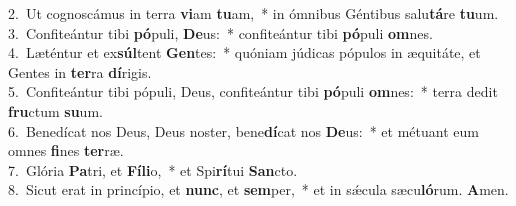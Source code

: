 {2.~}Ut cognoscámus in terra \textbf{vi}am \textbf{tu}am,~* in ómnibus Géntibus salu\textbf{tá}re \textbf{tu}um.\\
{3.~}Confiteántur tibi \textbf{pó}puli, \textbf{De}us:~* confiteántur tibi \textbf{pó}puli \textbf{om}nes.\\
{4.~}Læténtur et ex\textbf{súl}tent \textbf{Gen}tes:~* quóniam júdicas pópulos in æquitáte, et Gentes in \textbf{ter}ra \textbf{dí}rigis.\\
{5.~}Confiteántur tibi pópuli, Deus, confiteántur tibi \textbf{pó}puli \textbf{om}nes:~* terra dedit \textbf{fru}ctum \textbf{su}um.\\
{6.~}Benedícat nos Deus, Deus noster, bene\textbf{dí}cat nos \textbf{De}us:~* et métuant eum omnes \textbf{fi}nes \textbf{ter}ræ.\\
{7.~}Glória \textbf{Pa}tri, et \textbf{Fí}\textbf{li}o,~* et Spi\textbf{rí}tui \textbf{San}cto.\\
{8.~}Sicut erat in princípio, et \textbf{nunc}, et \textbf{sem}per,~* et in sǽcula sæcu\textbf{ló}rum. \textbf{A}men.\\

